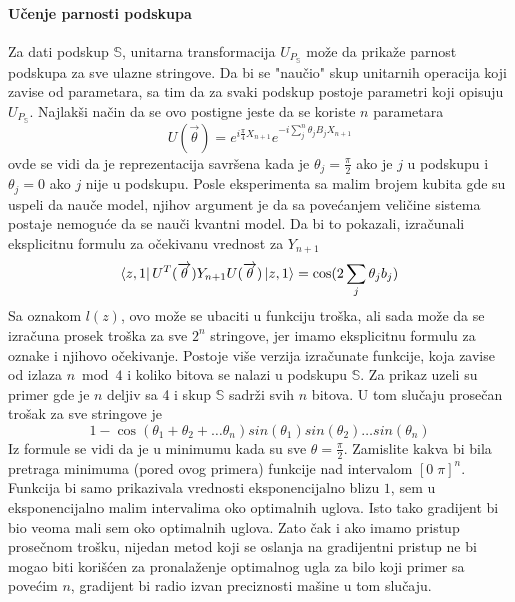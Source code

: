 \documentclass[12pt, letterpaper, oneside]{article}
\begin{document}
\paragraph{Učenje parnosti podskupa}
Za dati podskup $\mathbb{S}$, unitarna transformacija $U_{P_\mathbb{S}}$ može da prikaže parnost podskupa za sve ulazne stringove.
Da bi se "naučio" skup unitarnih operacija koji zavise od parametara, sa tim da za svaki podskup postoje parametri koji opisuju $U_{P_\mathbb{S}}$.
Najlakši način da se ovo postigne jeste da se koriste $n$ parametara
\[
    U(\overrightarrow{\theta}) = e^{i\frac{\pi}{4}X_{n+1}}e^{-i\sum_j^n \theta_jB_jX_{n+1}}
\]
ovde se vidi da je reprezentacija savršena kada je $\theta_j = \frac{\pi}{2}$ ako je $j$ u podskupu i $\theta_j = 0$ ako $j$ nije u podskupu.
Posle eksperimenta sa malim brojem kubita gde su uspeli da nauče model, njihov argument je da sa povećanjem veličine sistema postaje nemoguće da se nauči kvantni model.
Da bi to pokazali, izračunali eksplicitnu formulu za očekivanu vrednost za $Y_{n+1}$
\[
    \bra{z,1}U^T(\overrightarrow{\theta})Y_{n+1}U(\overrightarrow{\theta})\Ket{z,1} = \cos(2\sum_j\theta_jb_j)
\]
Sa oznakom $l(z)$, ovo može se ubaciti u funkciju troška, ali sada može da se izračuna prosek
troška za sve $2^n$ stringove, jer imamo eksplicitnu formulu za oznake i njihovo očekivanje.
Postoje više verzija izračunate funkcije, koja zavise od izlaza $n \bmod 4$ i koliko bitova se nalazi u podskupu $\mathbb{S}$.
Za prikaz uzeli su primer gde je $n$ deljiv sa 4 i skup $\mathbb{S}$ sadrži svih $n$ bitova.
U tom slučaju prosečan trošak za sve stringove je 
\[
    1 - \cos(\theta_1 + \theta_2 + \dots \theta_n)sin(\theta_1)sin(\theta_2) \dots sin(\theta_n)
\]
Iz formule se vidi da je u minimumu kada su sve $\theta=\frac{\pi}{2}$. Zamislite kakva bi bila pretraga minimuma (pored ovog primera) funkcije
nad intervalom $[0\;\pi]^n$. Funkcija bi samo prikazivala vrednosti eksponencijalno blizu $1$, sem u eksponencijalno malim intervalima oko optimalnih uglova.
Isto tako gradijent bi bio veoma mali sem oko optimalnih uglova. Zato čak i ako imamo pristup prosečnom trošku, nijedan metod koji se oslanja na gradijentni pristup
ne bi mogao biti korišćen za pronalaženje optimalnog ugla za bilo koji primer sa povećim $n$, gradijent bi radio izvan preciznosti mašine u tom slučaju.
\end{document}
